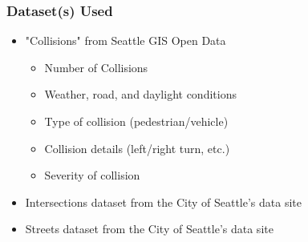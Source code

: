 \documentclass[t,12pt,numbers,fleqn]{beamer}
\begin{document}
\begin{frame}
\frametitle{Dataset(s) Used}
\begin{itemize}
    \item "Collisions" from Seattle GIS Open Data
    \begin{itemize}
        \item Number of Collisions
        \item Weather, road, and daylight conditions
        \item Type of collision (pedestrian/vehicle)
        \item Collision details (left/right turn, etc.)
        \item Severity of collision
    \end{itemize}
    \item Intersections dataset from the City of Seattle's data site
    \item Streets dataset from the City of Seattle's data site
\end{itemize}
\end{frame}
\end{document}
